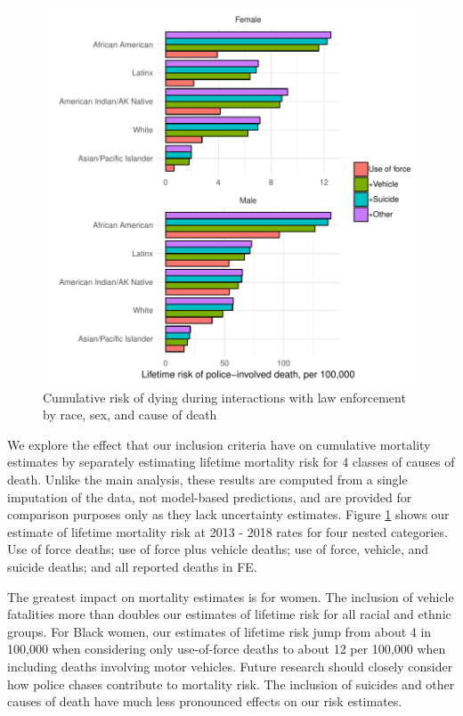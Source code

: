 \documentclass[9pt,twoside,lineno]{pnas-new}
\begin{document}
\begin{figure}[H]
	\includegraphics[width=\linewidth]{vis/death_type_c_new.pdf}
	\caption{Cumulative risk of dying during interactions with law enforcement by race, sex, and cause of death}
	\label{fig:death_type}
\end{figure}

We explore the effect that our inclusion criteria have on cumulative mortality estimates by separately estimating lifetime mortality risk for 4 classes of causes of death. Unlike the main analysis, these results are computed from a single imputation of the data, not model-based predictions, and are provided for comparison purposes only as they lack uncertainty estimates. Figure \ref{fig:death_type} shows our estimate of lifetime mortality risk at 2013 - 2018 rates for four nested categories. Use of force deaths; use of force plus vehicle deaths; use of force, vehicle, and suicide deaths; and all reported deaths in FE. 

The greatest impact on mortality estimates is for women. The inclusion of vehicle fatalities more than doubles our estimates of lifetime risk for all racial and ethnic groups. For Black women, our estimates of lifetime risk jump from about 4 in 100,000 when considering only use-of-force deaths to about 12 per 100,000 when including deaths involving motor vehicles. Future research should closely consider how police chases contribute to mortality risk. The inclusion of suicides and other causes of death have much less pronounced effects on our risk estimates.


\end{document}
